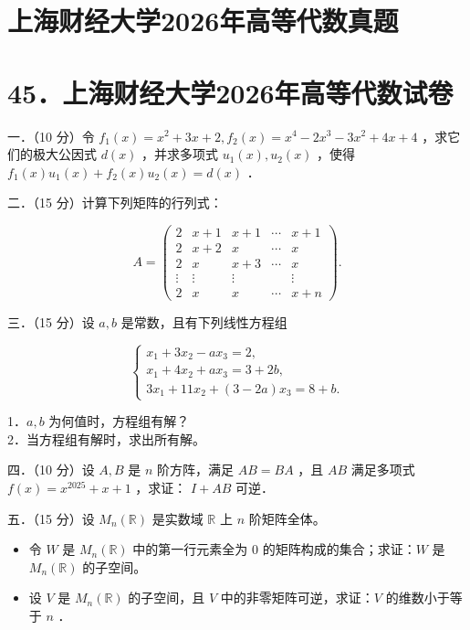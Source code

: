 \documentclass{article}
\begin{document}
\section*{上海财经大学2026年高等代数真题}
\section*{45．上海财经大学2026年高等代数试卷}
一．（10 分）令 \(f_{1}(x)=x^{2}+3 x+2, f_{2}(x)=x^{4}-2 x^{3}-3 x^{2}+4 x+4\) ，求它们的极大公因式 \(d(x)\) ，并求多项式 \(u_{1}(x), u_{2}(x)\) ，使得 \(f_{1}(x) u_{1}(x)+f_{2}(x) u_{2}(x)=d(x)\) ．

二．（15 分）计算下列矩阵的行列式：

\[
A=\left(\begin{array}{ccccc}
2 & x+1 & x+1 & \cdots & x+1 \\
2 & x+2 & x & \cdots & x \\
2 & x & x+3 & \cdots & x \\
\vdots & \vdots & \vdots & & \vdots \\
2 & x & x & \cdots & x+n
\end{array}\right) .
\]

三．（15 分）设 \(a, b\) 是常数，且有下列线性方程组

\[
\left\{\begin{array}{l}
x_{1}+3 x_{2}-a x_{3}=2, \\
x_{1}+4 x_{2}+a x_{3}=3+2 b, \\
3 x_{1}+11 x_{2}+(3-2 a) x_{3}=8+b .
\end{array}\right.
\]

1．\(a, b\) 为何值时，方程组有解？\\

2．当方程组有解时，求出所有解。

四．（10 分）设 \(A, B\) 是 \(n\) 阶方阵，满足 \(A B=B A\) ，且 \(A B\) 满足多项式 \(f(x)=x^{2025}+x+1\) ，求证： \(I+A B\) 可逆．

五．（15 分）设 \(M_{n}(\mathbb{R})\) 是实数域 \(\mathbb{R}\) 上 \(n\) 阶矩阵全体。

\begin{itemize}

  \item[1．] 令 \(W\) 是 \(M_{n}(\mathbb{R})\) 中的第一行元素全为 0 的矩阵构成的集合；求证：\(W\) 是 \(M_{n}(\mathbb{R})\) 的子空间。

  \item[2．] 设 \(V\) 是 \(M_{n}(\mathbb{R})\) 的子空间，且 \(V\) 中的非零矩阵可逆，求证：\(V\) 的维数小于等于 \(n\) ．
\end{itemize}
\end{document}
